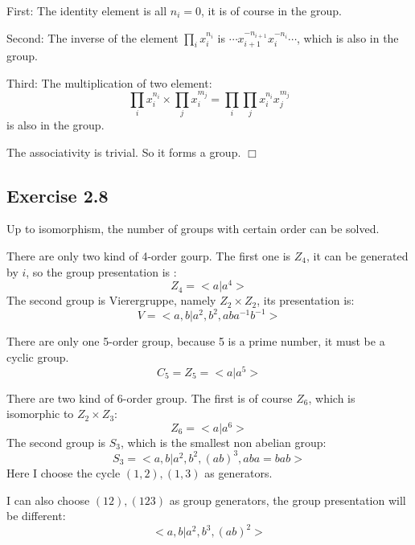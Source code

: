 \documentclass[]{ctexart}
\begin{document}
    First: The identity element is all $n_i=0$, it is of course in the group. 
    
    Second: The inverse of the element $\prod_i x_i^{n_i}$ is $\cdots x_{i+1}^{-n_{i+1}}x_i^{-n_i}\cdots$, which is also in the group. 
    
    Third: The multiplication of two element:
    \begin{equation*}
    	\prod_i x_i^{n_i}\times \prod_j x_i^{m_j}=\prod_i\prod_j x_i^{n_i}x_j^{m_j}
    \end{equation*}
    is also in the group. 
    
    The associativity is trivial. So it forms a group. \qquad $\Box$
    
    \subsection{Exercise 2.8}
    Up to isomorphism, the number of groups with certain order can be solved. 
    
    There are only two kind of 4-order gourp. The first one is $Z_4$, it can be generated by $i$, so the group presentation is :
    \begin{equation*}
    	Z_4=<a| a^4>
    \end{equation*}
    The second group is Vierergruppe, namely $Z_2\times Z_2$, its presentation is:
    \begin{equation*}
      V=<a,b| a^2,b^2,aba^{-1}b^{-1}>
    \end{equation*}
    
    There are only one 5-order group, because 5 is a prime number, it must be a cyclic group. 
    \begin{equation*}
      C_5=Z_5=<a| a^5>
    \end{equation*}
    
    There are two kind of 6-order group. The first is of course $Z_6$, which is isomorphic to $Z_2\times Z_3$:
    \begin{equation*}
      Z_6=<a| a^6>
    \end{equation*}
    The second group is $S_3$, which is the smallest non abelian group:
    \begin{equation*}
      S_3=<a,b| a^2,b^2,(ab)^3,aba=bab>
    \end{equation*}
      Here I choose the cycle $(1,2),(1,3)$ as generators.
      
      I can also choose $(12),(123)$ as group generators, the group presentation will be different:
      \begin{equation*}
      	<a,b|a^2,b^3,(ab)^2>
      \end{equation*}
      
\end{document}
